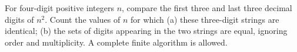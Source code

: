 For four-digit positive integers $n$, compare the first three and last three decimal digits of $n^2$. Count the values of $n$ for which (a) these three-digit strings are identical; (b) the sets of digits appearing in the two strings are equal, ignoring order and multiplicity. A complete finite algorithm is allowed.
